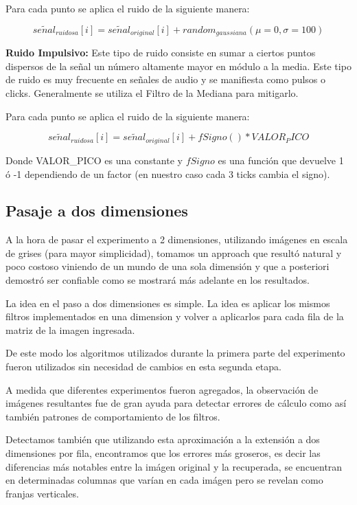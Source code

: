 \begin{itemize}
\begin{item}
 	Para cada punto se aplica el ruido de la siguiente manera:

    $$se\widetilde{n}al_{ruidosa}[i] = se\widetilde{n}al_{original}[i] + random_{gaussiana}(\mu=0, \sigma=100)$$


	\end{item}

	\begin{item}
		{\bf Ruido Impulsivo:} Este tipo de ruido consiste en sumar a ciertos puntos dispersos 
de la se\~nal un n\'umero altamente mayor en m\'odulo a la media. Este tipo de ruido es muy 
frecuente en se\~nales de audio y se manifiesta como pulsos o clicks.
Generalmente se utiliza el Filtro de la Mediana para mitigarlo.

 	Para cada punto se aplica el ruido de la siguiente manera:

    $$se\widetilde{n}al_{ruidosa}[i] = se\widetilde{n}al_{original}[i] + fSigno() * VALOR_PICO$$

	Donde VALOR\_PICO es una constante y $fSigno$ es una funci\'on que devuelve 1 \'o -1 dependiendo
	de un factor (en nuestro caso cada 3 ticks cambia el signo).

	\end{item}

\end{itemize}

\subsection{Pasaje a dos dimensiones}

A la hora de pasar el experimento a 2 dimensiones, utilizando im\'agenes en
escala de grises (para mayor simplicidad), tomamos un approach que result\'o
natural y poco costoso viniendo de un mundo de una sola dimensi\'on y que a
posteriori demostr\'o ser confiable como se mostrar\'a m\'as adelante en los
resultados.

La idea en el paso a dos dimensiones es simple. La idea es aplicar los mismos
filtros implementados en una dimension y volver a aplicarlos para cada fila de
la matriz de la imagen ingresada.

De este modo los algoritmos utilizados durante la primera parte del experimento
fueron utilizados sin necesidad de cambios en esta segunda etapa.

A medida que diferentes experimentos fueron agregados, la observaci\'on de
im\'agenes resultantes fue de gran ayuda para detectar errores de c\'alculo como
as\'i tambi\'en patrones de comportamiento de los filtros.

Detectamos tambi\'en que utilizando esta aproximaci\'on a la extensi\'on a dos
dimensiones por fila, encontramos que los errores m\'as groseros, es decir las
diferencias m\'as notables entre la im\'agen original y la recuperada, se
encuentran en determinadas columnas que var\'ian en cada im\'agen pero se
revelan como franjas verticales.
